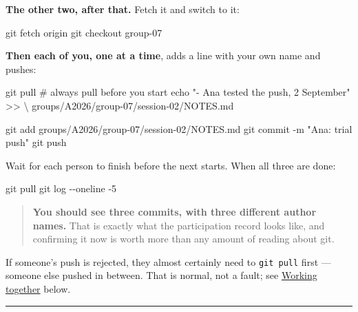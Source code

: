 \documentclass[
  letterpaper,
  10pt,
  twoside,
  openright,
  numbers=noenddot,
  chapterprefix=true]{scrbook}
\newenvironment{Shaded}{}{}
\newcommand{\AttributeTok}[1]{\textcolor[rgb]{0.84,0.23,0.29}{#1}}
\newcommand{\BuiltInTok}[1]{\textcolor[rgb]{0.84,0.23,0.29}{#1}}
\newcommand{\CommentTok}[1]{\textcolor[rgb]{0.42,0.45,0.49}{#1}}
\newcommand{\DataTypeTok}[1]{\textcolor[rgb]{0.84,0.23,0.29}{#1}}
\newcommand{\FunctionTok}[1]{\textcolor[rgb]{0.44,0.26,0.76}{#1}}
\newcommand{\NormalTok}[1]{\textcolor[rgb]{0.14,0.16,0.18}{#1}}
\newcommand{\OperatorTok}[1]{\textcolor[rgb]{0.14,0.16,0.18}{#1}}
\newcommand{\StringTok}[1]{\textcolor[rgb]{0.01,0.18,0.38}{#1}}
\begin{document}
\textbf{The other two, after that.} Fetch it and switch to it:

\begin{Shaded}
\begin{Highlighting}[]
\FunctionTok{git}\NormalTok{ fetch origin}
\FunctionTok{git}\NormalTok{ checkout group{-}07}
\end{Highlighting}
\end{Shaded}

\textbf{Then each of you, one at a time}, adds a line with your own name
and pushes:

\begin{Shaded}
\begin{Highlighting}[]
\FunctionTok{git}\NormalTok{ pull                              }\CommentTok{\# always pull before you start}
\BuiltInTok{echo} \StringTok{"{-} Ana tested the push, 2 September"} \OperatorTok{\textgreater{}\textgreater{}} \DataTypeTok{\textbackslash{}}
\NormalTok{  groups/A2026/group{-}07/session{-}02/NOTES.md}

\FunctionTok{git}\NormalTok{ add groups/A2026/group{-}07/session{-}02/NOTES.md}
\FunctionTok{git}\NormalTok{ commit }\AttributeTok{{-}m} \StringTok{"Ana: trial push"}
\FunctionTok{git}\NormalTok{ push}
\end{Highlighting}
\end{Shaded}

Wait for each person to finish before the next starts. When all three
are done:

\begin{Shaded}
\begin{Highlighting}[]
\FunctionTok{git}\NormalTok{ pull}
\FunctionTok{git}\NormalTok{ log }\AttributeTok{{-}{-}oneline} \AttributeTok{{-}5}
\end{Highlighting}
\end{Shaded}

\begin{quote}
\textbf{You should see three commits, with three different author
names.} That is exactly what the participation record looks like, and
confirming it now is worth more than any amount of reading about git.
\end{quote}

If someone's push is rejected, they almost certainly need to
\texttt{git\ pull} first --- someone else pushed in between. That is
normal, not a fault; see \hyperref[working-together]{Working together}
below.

\begin{center}\rule{0.5\linewidth}{0.5pt}\end{center}
\end{document}
